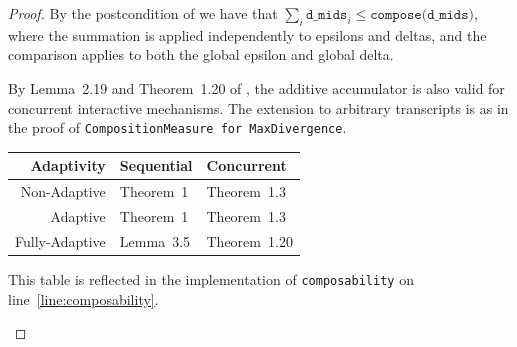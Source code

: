 \documentclass{article}
\begin{document}
\begin{proof}
  By the postcondition of  we have that $\sum_i \texttt{d\_mids}_i \le \texttt{compose(d\_mids)}$,
  where the summation is applied independently to epsilons and deltas, and the comparison applies to both the global epsilon and global delta.

  By Lemma~2.19 and Theorem~1.20 of \cite{haney2025concurrent}, the additive accumulator is also valid for concurrent interactive mechanisms.
  The extension to arbitrary transcripts is as in the proof of \texttt{CompositionMeasure for MaxDivergence}.

  \begin{center}
    \begin{tabular}{ r | l l }
      Adaptivity & Sequential & Concurrent \\
      \hline
      Non-Adaptive & Theorem~1\cite{dwork2006gaussian} & Theorem~1.3\cite{vadhan2023concurrent} \\
      Adaptive & Theorem~1\cite{dwork2006gaussian} & Theorem~1.3\cite{vadhan2023concurrent} \\
      Fully-Adaptive & Lemma~3.5\cite{rogers2021payasyougo} & Theorem~1.20\cite{haney2025concurrent}
    \end{tabular}

    This table is reflected in the implementation of \texttt{composability} on line~\ref{line:composability}.
  \end{center}

\end{proof}



\end{document}
